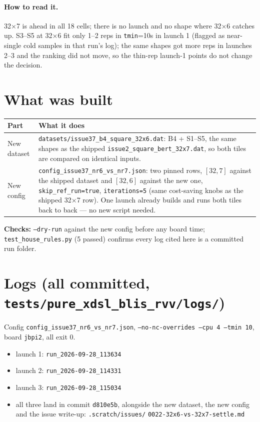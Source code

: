 \documentclass[10pt,a4paper]{article}
\begin{document}
\paragraph{How to read it.} 32$\times$7 is ahead in all 18 cells; there is no launch and no shape where 32$\times$6
catches up. S3--S5 at 32$\times$6 fit only 1--2 reps in \texttt{tmin}=10s in launch 1 (flagged as near-single cold
samples in that run's log); the same shapes got more reps in launches 2--3 and the ranking did not move, so the
thin-rep launch-1 points do not change the decision.

\section{What was built}
\begin{tabularx}{\linewidth}{@{}>{\raggedright\arraybackslash}p{2.6cm}X@{}}
\toprule
Part & What it does \\
\midrule
New dataset & \texttt{datasets/issue37\_b4\_square\_32x6.dat}: B4 + S1--S5, the same shapes as the shipped
\texttt{issue2\_square\_bert\_32x7.dat}, so both tiles are compared on identical inputs. \\
New config & \texttt{config\_issue37\_nr6\_vs\_nr7.json}: two pinned rows, $[32,7]$ against the shipped dataset and
$[32,6]$ against the new one, \texttt{skip\_ref\_run=true}, \texttt{iterations=5} (same cost-saving knobs as the
shipped 32$\times$7 row). One launch already builds and runs both tiles back to back --- no new script needed. \\
\bottomrule
\end{tabularx}

\textbf{Checks:} \texttt{--dry-run} against the new config before any board time; \texttt{test\_house\_rules.py}
(5 passed) confirms every log cited here is a committed run folder.

\appendix
\section{Logs (all committed, \texttt{tests/pure\_xdsl\_blis\_rvv/logs/})}
Config \texttt{config\_issue37\_nr6\_vs\_nr7.json}, \texttt{--no-nc-overrides --cpu 4 --tmin 10}, board
\texttt{jbpi2}, all exit 0.
\begin{itemize}
  \item launch 1: \texttt{run\_2026-09-28\_113634}
  \item launch 2: \texttt{run\_2026-09-28\_114331}
  \item launch 3: \texttt{run\_2026-09-28\_115034}
  \item all three land in commit \texttt{d810e5b}, alongside the new dataset, the new config and the issue
  write-up: \texttt{.scratch/issues/} \texttt{0022-32x6-vs-32x7-settle.md}
\end{itemize}
\end{document}
